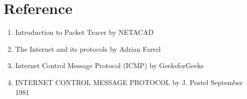 \documentclass[12pt,a4paper]{article}
\begin{document}
\section{\Large{Reference}}
\begin{enumerate}

\item Introduction to Packet Tracer by NETACAD
\item The Internet and its protocols by Adrian Farrel
\item Internet Control Message Protocol (ICMP) by GeeksforGeeks
\item INTERNET CONTROL MESSAGE PROTOCOL by J. Postel September 1981 
\end{enumerate}
\end{document}
